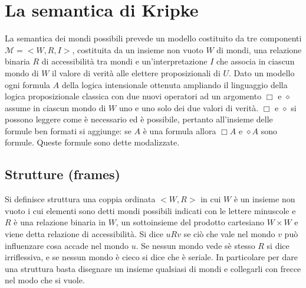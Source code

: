 \chapter{La semantica di Kripke}
La semantica dei mondi possibili prevede un modello costituito da tre componenti $\mathcal{M}=<W, R, I>$, costituita da un insieme non vuoto $W$ di mondi, una relazione binaria $R$ di accessibilit\`a tra
mondi e un'interpretazione $I$ che associa in ciascun mondo di $W$ il valore di verit\`a alle elettere proposizionali di $U$. Dato un modello ogni formula $A$ della logica intensionale ottenuta ampliando il 
linguaggio della logica proposizionale classica con due nuovi operatori ad un argomento $\Box$ e $\diamond$ assume in ciascun mondo di $W$ uno e uno solo dei due valori di verit\`a. $\Box$ e $\diamond$ si 
possono leggere come \`e necessario ed \`e possibile, pertanto all'insieme delle formule ben formati si aggiunge: se $A$ \`e una formula allora $\Box A$ e $\diamond A$ sono formule. Queste formule sono 
dette modalizzate.
\section{Strutture (frames)}
Si definisce struttura una coppia ordinata $<W, R>$ in cui $W$ \`e un insieme non vuoto i cui elementi sono detti mondi possibili indicati con le lettere minuscole e $R$ \`e una relazione binaria in $W$, un
sottoinsieme del prodotto cartesiano $W\times W$ e viene detta relazione di accessibilit\`a. Si dice $uRv$ se ci\`o che vale nel mondo $v$ pu\`o influenzare cosa accade nel mondo $u$. Se nessun mondo vede
s\`e stesso $R$ si dice irriflessiva, e se nessun mondo \`e cieco si dice che \`e seriale. In particolare per dare una struttura basta disegnare un insieme qualsiasi di mondi e collegarli con frecce nel modo che si 
vuole. 
